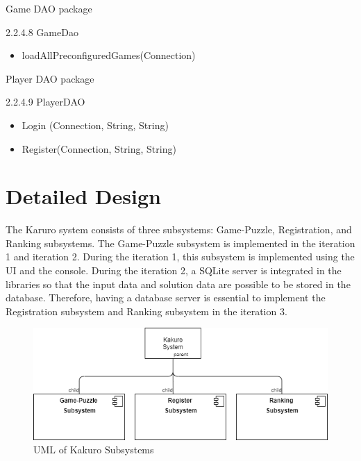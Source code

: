 \documentclass[12pt]{article}
\begin{document}
Game DAO package\newline

2.2.4.8 GameDao\newline

\begin{itemize}
\item loadAllPreconfiguredGames(Connection) \newline
\end{itemize}


Player DAO package\newline

2.2.4.9 PlayerDAO\newline

\begin{itemize}
\item Login (Connection, String, String)
\item Register(Connection, String, String) \newline
\end{itemize}



\newpage

\section{Detailed Design} \label{sec:detail}

The Karuro system consists of three subsystems: Game-Puzzle, Registration, and Ranking subsystems. The Game-Puzzle subsystem is implemented in the iteration 1 and iteration 2. During the iteration 1, this subsystem is implemented using the UI and the console. During the iteration 2, a SQLite server is integrated in the libraries so that the input data and solution data are possible to be stored in the database. Therefore, having a database server is essential to implement the Registration subsystem and Ranking subsystem in the iteration 3. 

\begin{figure}[htbp]
    \includegraphics[width=1\textwidth]{Subsystems_UML}
    \caption{UML of Kakuro Subsystems}
    \label{fig:Subsystems_UML}
\end{figure}
\end{document}
